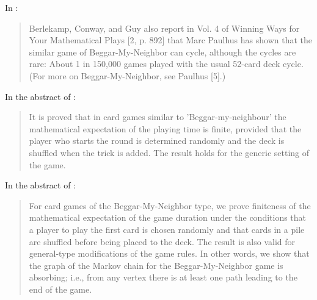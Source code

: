 \documentclass[a4paper,12pt]{article}
\begin{document}
In \cite{spivey2010cycles}:
\begin{quotation}
Berlekamp, Conway, and Guy also report in Vol. 4 of Winning Ways for Your 
Mathematical Plays [2, p. 892] that Marc Paulhus has shown that the similar game 
of Beggar-My-Neighbor can cycle, although the cycles are rare: About 1 in 
150,000 games played with the usual 52-card deck cycle. (For more on 
Beggar-My-Neighbor, see Paulhus [5].)
\end{quotation}

In the abstract of \cite{russians_arxiv}:
\begin{quotation}
It is proved that in card games similar to 'Beggar-my-neighbour' the 
mathematical expectation of the playing time is finite, provided that the player 
who starts the round is determined randomly and the deck is shuffled when the 
trick is added. The result holds for the generic setting of the game.
\end{quotation}

In the abstract of \cite{russians_2013}:
\begin{quotation}
For card games of the Beggar-My-Neighbor type, we prove finiteness of the 
mathematical expectation of the game duration under the conditions that a player 
to play the first card is chosen randomly and that cards in a pile are shuffled 
before being placed to the deck. The result is also valid for general-type 
modifications of the game rules. In other words, we show that the graph of the 
Markov chain for the Beggar-My-Neighbor game is absorbing; i.e., from any vertex 
there is at least one path leading to the end of the game.
\end{quotation}



\end{document}

